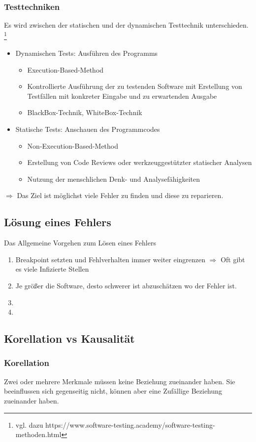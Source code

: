 \documentclass[a4paper,10pt]{scrartcl}
\begin{document}
\subsubsection{Testtechniken}
Es wird zwischen der statischen und der dynamischen Testtechnik unterschieden. 
\footnote{vgl. dazu https://www.software-testing.academy/software-testing-methoden.html}
\begin{itemize}
	\item Dynamischen Tests: Ausführen des Programms
	\begin{itemize}
		\item Execution-Based-Method
		\item Kontrollierte Ausführung der zu testenden Software mit Erstellung von Testfällen mit konkreter Eingabe und zu erwartenden Ausgabe
		\item BlackBox-Technik, WhiteBox-Technik
	\end{itemize}
    \item Statische Tests: Anschauen des Programmcodes
    \begin{itemize}
    	\item Non-Execution-Based-Method
    	\item Erstellung von Code Reviews oder werkzeuggestützter statischer Analysen
    	\item Nutzung der menschlichen Denk- und Analysefähigkeiten
    \end{itemize}
\end{itemize}
$\Rightarrow$ Das Ziel ist möglichst viele Fehler zu finden und diese zu reparieren.
\newpage
\subsection{Lösung eines Fehlers}
Das Allgemeine Vorgehen zum Lösen eines Fehlers
\begin{enumerate}
    \item Breakpoint setzten und Fehlverhalten immer weiter eingrenzen
    $\Rightarrow$ Oft gibt es viele Infizierte Stellen
    \item Je größer die Software, desto schwerer ist abzuschätzen wo der Fehler ist.
    \item 
    \item 
\end{enumerate}
\newpage
\subsection{Korellation vs Kausalität}
\subsubsection{Korellation}
Zwei oder mehrere Merkmale müssen keine Beziehung zueinander haben. Sie beeinflussen sich gegenseitig nicht, können aber eine Zufällige Beziehung zueinander haben.
\end{document}
